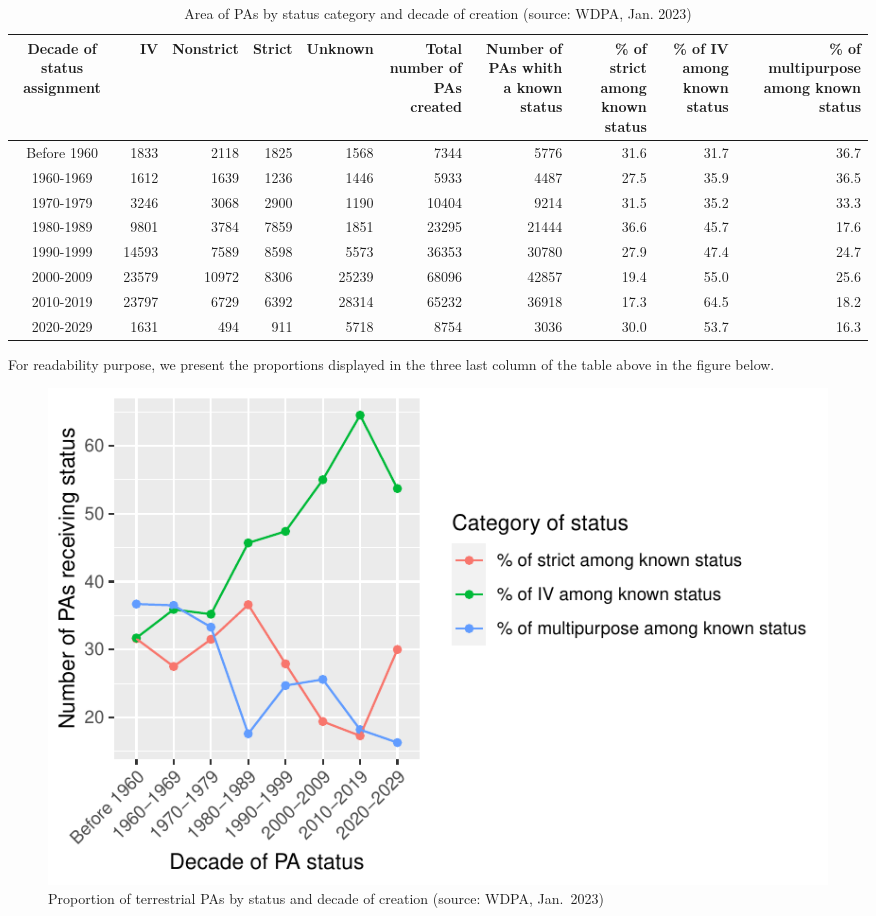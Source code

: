 \documentclass[
  letterpaper,
  DIV=11,
  numbers=noendperiod]{scrartcl}
\begin{document}
\hypertarget{tbl-npas}{}
\begin{longtable}{crrrrrrrrr}
\caption{\label{tbl-npas}Area of PAs by status category and decade of creation (source: WDPA,
Jan. 2023) }\tabularnewline

\toprule
Decade of status assignment & IV & Nonstrict & Strict & Unknown & Total number of PAs created & Number of PAs whith a known status & \% of strict among known status & \% of IV among known status & \% of multipurpose among known status \\ 
\midrule
Before 1960 & 1833 & 2118 & 1825 & 1568 & 7344 & 5776 & 31.6 & 31.7 & 36.7 \\ 
1960-1969 & 1612 & 1639 & 1236 & 1446 & 5933 & 4487 & 27.5 & 35.9 & 36.5 \\ 
1970-1979 & 3246 & 3068 & 2900 & 1190 & 10404 & 9214 & 31.5 & 35.2 & 33.3 \\ 
1980-1989 & 9801 & 3784 & 7859 & 1851 & 23295 & 21444 & 36.6 & 45.7 & 17.6 \\ 
1990-1999 & 14593 & 7589 & 8598 & 5573 & 36353 & 30780 & 27.9 & 47.4 & 24.7 \\ 
2000-2009 & 23579 & 10972 & 8306 & 25239 & 68096 & 42857 & 19.4 & 55.0 & 25.6 \\ 
2010-2019 & 23797 & 6729 & 6392 & 28314 & 65232 & 36918 & 17.3 & 64.5 & 18.2 \\ 
2020-2029 & 1631 & 494 & 911 & 5718 & 8754 & 3036 & 30.0 & 53.7 & 16.3 \\ 
\bottomrule
\end{longtable}

For readability purpose, we present the proportions displayed in the
three last column of the table above in the figure below.

\begin{figure}

{\centering \includegraphics{Suppl_material_test_EoH_files/figure-pdf/fig-prop-pas-n-1.pdf}

}

\caption{\label{fig-prop-pas-n}Proportion of terrestrial PAs by status
and decade of creation (source: WDPA, Jan.~2023)}

\end{figure}
\end{document}
